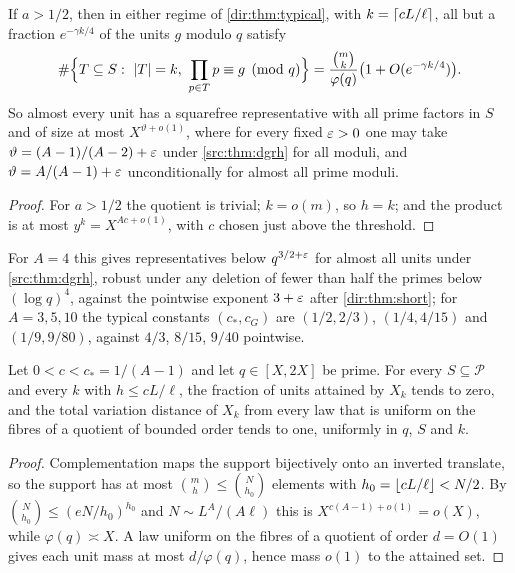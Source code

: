 \begin{corollary}\label{dir:cor:typical}
If $a>1/2$, then in either regime of \cref{dir:thm:typical}, with $k=\lceil cL/\ell\rceil$, all but a fraction
$e^{-\gamma k/4}$ of the units $g$ modulo $q$ satisfy
\[
 \#\Bigl\{T\subseteq S:\ \abs T=k,\ \prod_{p\in T}p\equiv g\pmod q\Bigr\}
 =\frac{\binom mk}{\varphi(q)}\bigl(1+O(e^{-\gamma k/4})\bigr).
\]
So almost every unit has a squarefree representative with all prime factors in $S$ and of size at
most $X^{\vartheta+o(1)}$, where for every fixed $\varepsilon>0$ one may take $\vartheta=(A-1)/(A-2)+\varepsilon$ under
\cref{src:thm:dgrh} for all moduli, and $\vartheta=A/(A-1)+\varepsilon$ unconditionally for almost all prime moduli.
\end{corollary}

\begin{proof}
For $a>1/2$ the quotient is trivial; $k=o(m)$, so $h=k$; and the product is at most
$y^k=X^{Ac+o(1)}$, with $c$ chosen just above the threshold.
\end{proof}

For $A=4$ this gives representatives below $q^{3/2+\varepsilon}$ for almost all units under
\cref{src:thm:dgrh}, robust under any deletion of fewer than half the primes below $(\log q)^4$,
against the pointwise exponent $3+\varepsilon$ after \cref{dir:thm:short}; for $A=3,5,10$ the typical constants
$(c_*,c_G)$ are $(1/2,2/3)$, $(1/4,4/15)$ and $(1/9,9/80)$, against $4/3$, $8/15$, $9/40$ pointwise.

\begin{theorem}\label{dir:thm:typicalsharp}
Let $0<c<c_*=1/(A-1)$ and let $q\in[X,2X]$ be prime. For every $S\subseteq\mathcal P$ and every $k$ with
$h\le cL/\ell$, the fraction of units attained by $X_k$ tends to zero, and the total variation distance of
$X_k$ from every law that is uniform on the fibres of a quotient of bounded order tends to one,
uniformly in $q$, $S$ and $k$.
\end{theorem}

\begin{proof}
Complementation maps the support bijectively onto an inverted translate, so the support has at most
$\binom mh\le\binom N{h_0}$ elements with $h_0=\lfloor cL/\ell\rfloor<N/2$. By $\binom N{h_0}\le(eN/h_0)^{h_0}$ and
$N\sim L^A/(A\ell)$ this is $X^{c(A-1)+o(1)}=o(X)$, while $\varphi(q)\asymp X$. A law uniform on the
fibres of a quotient of order $d=O(1)$ gives each unit mass at most $d/\varphi(q)$, hence mass $o(1)$ to
the attained set.
\end{proof}

